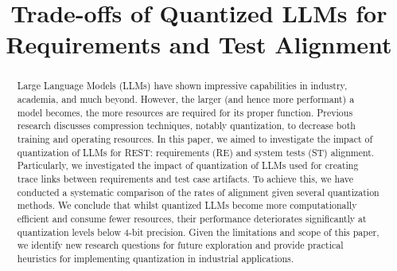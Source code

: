 \documentclass[conference]{IEEEtran}
\begin{document}
\title{Trade-offs of Quantized LLMs for Requirements and Test Alignment}

\author{
  \and
  \and
}

\maketitle

\begin{abstract}
Large Language Models (LLMs) have shown impressive capabilities in industry,
academia, and much beyond. However, the larger (and hence more performant) a
model becomes, the more resources are required for its proper function. Previous
research discusses compression techniques, notably quantization, to decrease
both training and operating resources. In this paper, we aimed to investigate
the impact of quantization of LLMs for REST: requirements (RE) and system tests
(ST) alignment. Particularly, we investigated the impact of quantization of LLMs
used for creating trace links between requirements and test case artifacts. To
achieve this, we have conducted a systematic comparison of the rates of
alignment given several quantization methods. 
We conclude that whilst quantized LLMs become more computationally efficient and
consume fewer resources, their performance deteriorates significantly at
quantization levels below 4-bit precision. Given the limitations and scope of
this paper, we identify new research questions for future exploration and
provide practical heuristics for implementing quantization in industrial
applications.
\end{abstract}
\end{document}
